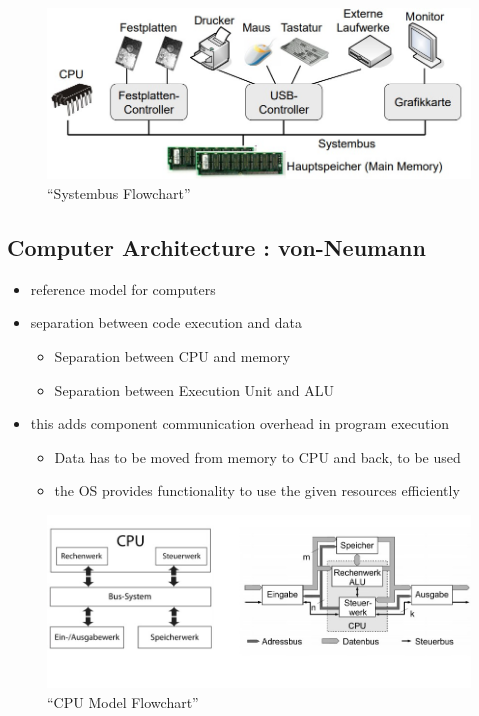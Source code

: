 \documentclass[
]{article}
\providecommand{\tightlist}{%
  \setlength{\itemsep}{0pt}\setlength{\parskip}{0pt}}
\begin{document}
\begin{figure}
\centering
\includegraphics{../images/BUS_Systembus-Flowchart.jpg}
\caption{``Systembus Flowchart''}
\end{figure}

\newpage
\hypertarget{computer-architecture-von-neumann}{%
\subsection{Computer Architecture :
von-Neumann}\label{computer-architecture-von-neumann}}

\begin{itemize}
\tightlist
\item
  reference model for computers
\item
  separation between code execution and data

  \begin{itemize}
  \tightlist
  \item
    Separation between CPU and memory
  \item
    Separation between Execution Unit and ALU
  \end{itemize}
\item
  this adds component communication overhead in program execution

  \begin{itemize}
  \tightlist
  \item
    Data has to be moved from memory to CPU and back, to be used
  \item
    the OS provides functionality to use the given resources efficiently
  \end{itemize}
\end{itemize}

\begin{figure}
\centering
\includegraphics{../images/CPU_model-flowchart.jpg}
\caption{``CPU Model Flowchart''}
\end{figure}
\end{document}
